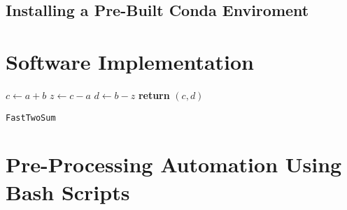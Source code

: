 \documentclass{article}
\begin{document}
\subsection{Installing a Pre-Built Conda Enviroment}

\section{Software Implementation}
\begin{center}
	\begin{minipage}{0.5\linewidth} %
		\begin{algorithm}[H]
			\medskip
			$c \leftarrow a + b$ \;
			$z \leftarrow c - a$ \;
			$d \leftarrow b - z$ \;
			{\bf return} $(c,d)$ \;
			\caption{\texttt{FastTwoSum}} %
			\label{alg:fastTwoSum}   %
		\end{algorithm}
	\end{minipage}
\end{center}


\section{Pre-Processing Automation Using Bash Scripts}


\end{document}
